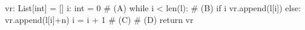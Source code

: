 vr: List[int] = []
i: int = 0
# (A)
while i < len(l):
  # (B)
  if i %
    vr.append(l[i])
  else:
    vr.append(l[i]+n)
  i = i + 1
  # (C)
# (D)
return vr
